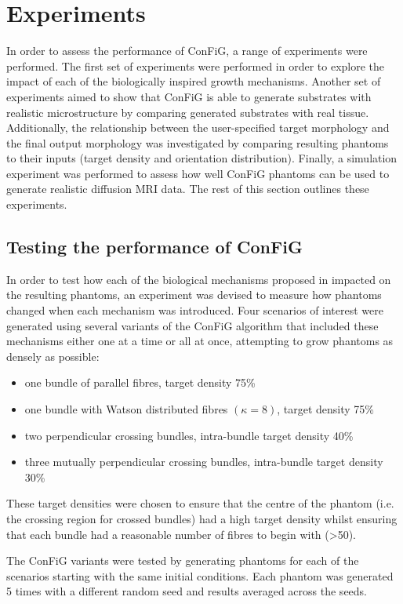 \section{Experiments}
\label{sec:config_experiments}
In order to assess the performance of \ac{ConFiG}, a range of experiments were performed. The first set of experiments were performed in order to explore the impact of each of the biologically inspired growth mechanisms. Another set of experiments aimed to show that \ac{ConFiG} is able to generate substrates with realistic microstructure by comparing generated substrates with real tissue. Additionally, the relationship between the user-specified target morphology and the final output morphology was investigated by comparing resulting phantoms to their inputs (target density and orientation distribution). Finally, a simulation experiment was performed to assess how well \ac{ConFiG} phantoms can be used to generate realistic diffusion \ac{MRI} data. The rest of this section outlines these experiments.

\subsection{Testing the performance of \ac{ConFiG}}
\label{sec:config_test_perf}
In order to test how each of the biological mechanisms proposed in  impacted on the resulting phantoms, an experiment was devised to measure how phantoms changed when each mechanism was introduced. Four scenarios of interest were generated using several variants of the \ac{ConFiG} algorithm that included these mechanisms either one at a time or all at once, attempting to grow phantoms as densely as possible:
\begin{itemize}
  \item one bundle of parallel fibres, target density 75\%
  \item one bundle with Watson distributed fibres $(\kappa=8)$, target density 75\%
  \item two perpendicular crossing bundles, intra-bundle target density 40\%
  \item three mutually perpendicular crossing bundles, intra-bundle target density 30\%
\end{itemize}
These target densities were chosen to ensure that the centre of the phantom (i.e. the crossing region for crossed bundles) had a high target density whilst ensuring that each bundle had a reasonable number of fibres to begin with (>50).

The \ac{ConFiG} variants were tested by generating phantoms for each of the scenarios starting with the same initial conditions. Each phantom was generated 5 times with a different random seed and results averaged across the seeds.

